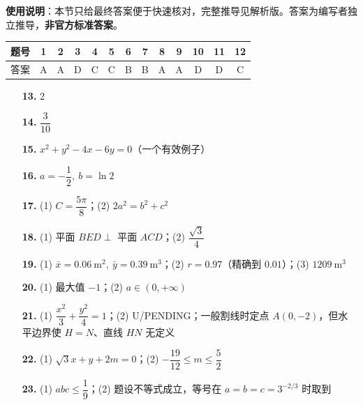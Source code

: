 
\begin{gknotice}
\textbf{使用说明}：本节只给最终答案便于快速核对，完整推导见解析版。答案为编写者独立推导，\textbf{非官方标准答案}。
\end{gknotice}

\begin{center}\begin{tabular}{ccccccccccccc}
\toprule
题号 & 1 & 2 & 3 & 4 & 5 & 6 & 7 & 8 & 9 & 10 & 11 & 12 \\
\midrule
答案 & A & A & D & C & C & B & B & A & A & D & D & C \\
\bottomrule
\end{tabular}\end{center}

\begin{itemize}[leftmargin=2.6em]
  \item[\textbf{13.}] $2$
  \item[\textbf{14.}] $\dfrac3{10}$
  \item[\textbf{15.}] $x^2+y^2-4x-6y=0$（一个有效例子）
  \item[\textbf{16.}] $a=-\dfrac12,\ b=\ln2$
\end{itemize}

\begin{itemize}[leftmargin=2.6em]
  \item[\textbf{17.}] (1) $C=\dfrac{5\pi}{8}$；(2) $2a^2=b^2+c^2$
  \item[\textbf{18.}] (1) 平面 $BED\perp$ 平面 $ACD$；(2) $\dfrac{\sqrt3}{4}$
  \item[\textbf{19.}] (1) $\bar x=0.06\ \mathrm m^2,\ \bar y=0.39\ \mathrm m^3$；(2) $r=0.97$（精确到 $0.01$）；(3) $1209\ \mathrm m^3$
  \item[\textbf{20.}] (1) 最大值 $-1$；(2) $a\in(0,+\infty)$
  \item[\textbf{21.}] (1) $\dfrac{x^2}{3}+\dfrac{y^2}{4}=1$；(2) U/PENDING；一般割线时定点 $A(0,-2)$，但水平边界使 $H=N$、直线 $HN$ 无定义
\end{itemize}

\begin{itemize}[leftmargin=2.6em]
  \item[\textbf{22.}] (1) $\sqrt3x+y+2m=0$；(2) $-\dfrac{19}{12}\le m\le\dfrac52$
  \item[\textbf{23.}] (1) $abc\le\dfrac19$；(2) 题设不等式成立，等号在 $a=b=c=3^{-2/3}$ 时取到
\end{itemize}
